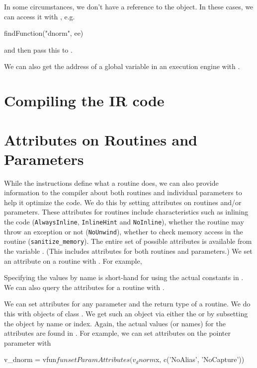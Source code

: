\documentclass[article]{jss}
\def\LLVMAttr#1{\texttt{#1}}
\begin{document}

In some circumstances, we don't have a reference to the
 object. In these cases, we can access it with
, e.g.
\begin{RCode}
findFunction("dnorm", ee)
\end{RCode}
and then pass this to .

We can also get the address of a global variable in an execution
engine with .


\section{Compiling the IR code}


\section{Attributes on Routines and Parameters}
While the instructions define what a routine does, we can also provide
information to the \llvm{} compiler about both routines and individual
parameters to help it optimize the code.  We do this by setting
attributes on routines and/or parameters.  These attributes for
routines include characteristics such as inlining the code
(\LLVMAttr{AlwaysInline}, \LLVMAttr{InlineHint} and \LLVMAttr{NoInline}), whether the routine may throw
an exception or not (\LLVMAttr{NoUnwind}), whether to check memory access in the
routine (\verb+sanitize_memory+).
The entire set of possible attributes is available from the variable
. (This includes attributes
for both routines and parameters.)
We set an attribute on a routine with .
For example, 
Specifying the values by name is short-hand for using the actual
constants in .
We can also query the attributes for a routine with
.

We can set attributes for any parameter and the
return type of a routine. %
We do this with objects of class .
We get such an object via either the  or 
by subsetting the  object by name or index.
Again, the actual values (or names) for the attributes are found in
.
For example, we can set attributes on the pointer parameter 
with
\begin{RCode}
v_dnorm = vfun$fun
setParamAttributes(v_dnorm$x, c('NoAlias', 'NoCapture'))
\end{RCode}
\end{document}
